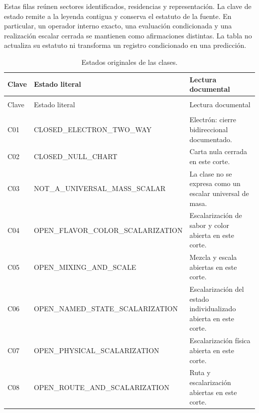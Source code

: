 Estas filas reúnen sectores identificados, residencias y representación. La clave
de estado remite a la leyenda contigua y conserva el estatuto de la fuente.
En particular, un operador interno exacto, una evaluación condicionada y una
realización escalar cerrada se mantienen como afirmaciones distintas. La tabla
no actualiza su estatuto ni transforma un registro condicionado en una predicción.

\begingroup
\setlength{\tabcolsep}{4pt}
\setlength{\extrarowheight}{4pt}
\renewcommand{\arraystretch}{1.13}
\begin{longtable}{@{}>{\raggedright\arraybackslash}p{}>{\raggedright\arraybackslash}p{}>{\raggedright\arraybackslash}p{}@{}}
\caption{Estados originales de las clases.}\label{tab:vi-estados-clases}\\
\toprule
Clave & Estado literal & Lectura documental \\
\midrule
\endfirsthead
\multicolumn{3}{l}{\textit{Continuación}}\\
\toprule
Clave & Estado literal & Lectura documental \\
\midrule
\endhead
\midrule
\multicolumn{3}{r}{Continúa en la página siguiente}\\
\endfoot
\bottomrule
\endlastfoot
C01 & CLOSED\_\allowbreak{}ELECTRON\_\allowbreak{}TWO\_\allowbreak{}WAY & Electrón: cierre bidireccional documentado. \\
C02 & CLOSED\_\allowbreak{}NULL\_\allowbreak{}CHART & Carta nula cerrada en este corte. \\
C03 & NOT\_\allowbreak{}A\_\allowbreak{}UNIVERSAL\_\allowbreak{}MASS\_\allowbreak{}SCALAR & La clase no se expresa como un escalar universal de masa. \\
C04 & OPEN\_\allowbreak{}FLAVOR\_\allowbreak{}COLOR\_\allowbreak{}SCALARIZATION & Escalarización de sabor y color abierta en este corte. \\
C05 & OPEN\_\allowbreak{}MIXING\_\allowbreak{}AND\_\allowbreak{}SCALE & Mezcla y escala abiertas en este corte. \\
C06 & OPEN\_\allowbreak{}NAMED\_\allowbreak{}STATE\_\allowbreak{}SCALARIZATION & Escalarización del estado individualizado abierta en este corte. \\
C07 & OPEN\_\allowbreak{}PHYSICAL\_\allowbreak{}SCALARIZATION & Escalarización física abierta en este corte. \\
C08 & OPEN\_\allowbreak{}ROUTE\_\allowbreak{}AND\_\allowbreak{}SCALARIZATION & Ruta y escalarización abiertas en este corte. \\
\end{longtable}
\endgroup

